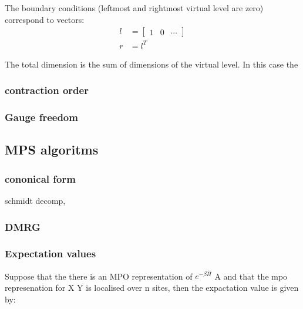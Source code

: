 The boundary conditions (leftmost and rightmost virtual level are zero) correspond to vectors:
\begin{equation}
    \begin{split}
        l &= \begin{bmatrix} 1 & 0
                  & \cdots\end{bmatrix} \\
        r &= l^{T}
    \end{split}
\end{equation}

The total dimension is the sum of dimensions of the virtual level. In this case the 
\subsubsection{contraction order}

\subsubsection{Gauge freedom}

\subsection{MPS algoritms}


\subsubsection{cononical form}

schmidt decomp,

\subsubsection{DMRG}

\subsubsection{Expectation values}

Suppose that the there is an MPO representation of $ e^{ - \beta \hat{H} } $ A and that the mpo represenation for X Y is localised over n sites, then the expactation value is given by:

